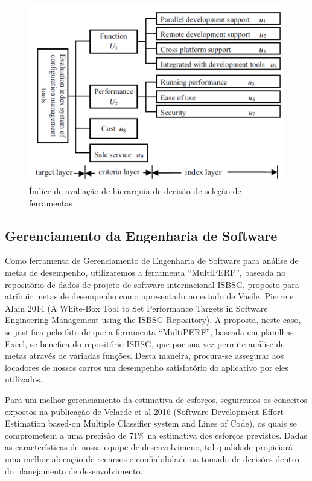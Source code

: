 \documentclass[12pt]{article}
\begin{document}
\begin{figure}[htp]
\centering
\includegraphics[scale=.8] {swebok_configuration.png}
\caption{Índice de avaliação de hierarquia de decisão de seleção de ferramentas}
\label{fig:exampleFig3}
\end{figure}


\subsection{Gerenciamento da Engenharia de Software}

Como ferramenta de Gerenciamento de Engenharia de Software para análise de metas de desempenho, utilizaremos a ferramenta “MultiPERF”, baseada no repositório de dados de projeto de software internacional ISBSG, proposto para atribuir metas de desempenho como apresentado no estudo de Vasile, Pierre e Alain 2014 (A White-Box Tool to Set Performance Targets in Software Engineering Management using the ISBSG Repository). A proposta, neste caso, se justifica pelo fato de que a ferramenta “MultiPERF”, baseada em planilhas Excel, se benefica do repositório ISBSG, que por sua vez permite análise de metas através de variadas funções. Desta maneira, procura-se assegurar aos locadores de nossos carros um desempenho satisfatório do aplicativo por eles utilizados.

Para um melhor gerenciamento da estimativa de esforços, seguiremos os conceitos expostos na publicação de Velarde et al 2016 (Software Development Effort Estimation based-on Multiple Classifier system and Lines of Code), os quais se comprometem a uma precisão de 71\% na estimativa dos esforços previstos. Dadas as características de nossa equipe de desenvolvimeno, tal qualidade propiciará uma melhor alocação de recursos e confiabilidade na tomada de decisões dentro do planejamento de desenvolvimento.
\end{document}
